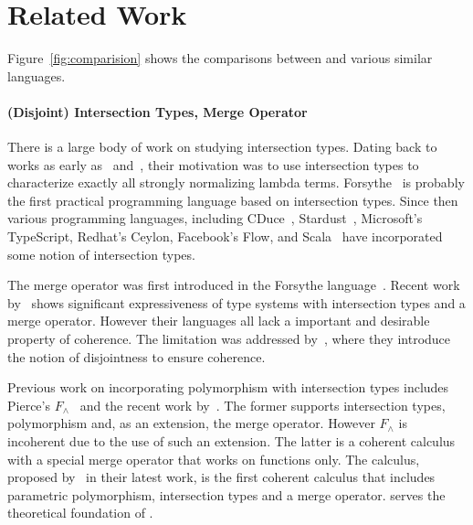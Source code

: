 \section{Related Work}

Figure~\ref{fig:comparision} shows the comparisons between \name and various
similar languages.


\paragraph{(Disjoint) Intersection Types, Merge Operator}

There is a large body of work on studying intersection types. Dating back to
works as early as~\citet{coppo1981functional} and~\citet{pottinger1980type},
their motivation was to use intersection types to characterize exactly all
strongly normalizing lambda terms. Forsythe~\cite{reynolds1997design} is
probably the first practical programming language based on intersection types.
Since then various programming languages, including
CDuce~\cite{benzaken2003cduce}, Stardust~\cite{Dunfield07:Stardust}, Microsoft's
TypeScript, Redhat's Ceylon, Facebook's Flow, and Scala~\cite{scala-overview}
have incorporated some notion of intersection types.

The merge operator was first introduced in the Forsythe
language~\cite{reynolds1997design}. Recent work
by~\citet{dunfield2014elaborating} shows significant expressiveness of type
systems with intersection types and a merge operator. However their languages
all lack a important and desirable property of coherence. The limitation was
addressed by~\citet{oliveira2016disjoint}, where they introduce the notion of
disjointness to ensure coherence.

Previous work on incorporating polymorphism with intersection types includes
Pierce's $F_\wedge$~\cite{pierce1991programming2} and the recent work
by~\citet{Castagna:2014}. The former supports intersection types, polymorphism
and, as an extension, the merge operator. However $F_\wedge$ is incoherent due
to the use of such an extension. The latter is a coherent calculus with a
special merge operator that works on functions only. The \bname calculus,
proposed by~\citet{alpuimdisjoint} in their latest work, is the first coherent
calculus that includes parametric polymorphism, intersection types and a merge
operator. \bname serves the theoretical foundation of \name.



